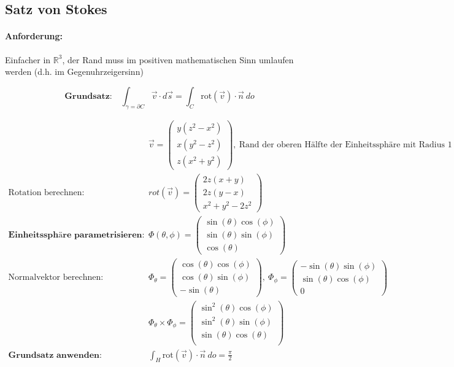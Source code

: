 \documentclass[11pt]{article}
\begin{document}
\clearpage

\subsection{Satz von Stokes}

\paragraph{Anforderung:} Einfacher in $\mathbb{R}^3$, der Rand muss im positiven mathematischen Sinn umlaufen werden (d.h. im Gegenuhrzeigersinn)

\begin{equation*}
	\textbf{Grundsatz:}\quad\int_{\gamma = \partial C} \vec{v} \cdot d\vec{s} = \int_C \text{rot}(\vec{v}) \cdot \vec{n}\ do
\end{equation*}

\begin{equation*}
\begin{split}
	& \vec{v} = \begin{pmatrix}
		y(z^2-x^2) \\ x(y^2 - z^2) \\ z(x^2 + y^2)
	\end{pmatrix},\ \text{Rand der oberen H{\"a}lfte der Einheitssph{\"a}re mit Radius $1$ um $(0,0, 0)$} \\
	\text{Rotation berechnen:}\quad & rot(\vec{v}) = \begin{pmatrix}
		2z(x+y) \\ 2z(y-x) \\ x^2 + y^2 - 2z^2
	\end{pmatrix} \\
	\textbf{Einheitssph{\"a}re parametrisieren:}\quad & \Phi(\theta, \phi) = \begin{pmatrix}
		\sin(\theta)\cos(\phi) \\ \sin(\theta)\sin(\phi) \\ \cos(\theta)
	\end{pmatrix} \\
	\text{Normalvektor berechnen:}\quad & \Phi_\theta = \begin{pmatrix}
		\cos(\theta)\cos(\phi) \\ \cos(\theta)\sin(\phi) \\ -\sin(\theta)
	\end{pmatrix},\ \Phi_\phi = \begin{pmatrix}
		-\sin(\theta)\sin(\phi) \\ \sin(\theta)\cos(\phi) \\ 0
	\end{pmatrix} \\
	& \Phi_\theta \times \Phi_\phi = \begin{pmatrix}
		\sin^2(\theta)\cos(\phi) \\ \sin^2(\theta)\sin(\phi) \\ \sin(\theta)\cos(\theta) \\
	\end{pmatrix} \\
	\textbf{Grundsatz anwenden:} \quad & \int_H \text{rot}(\vec{v}) \cdot \vec{n}\ do = \frac{\pi}{2}
\end{split}
\end{equation*}
\end{document}
